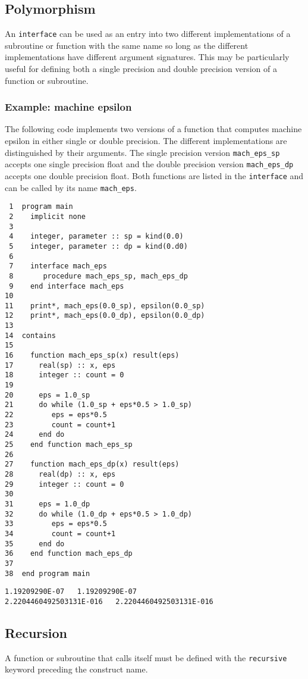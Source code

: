 \documentclass[11pt]{article}
\begin{document}
\subsection{Polymorphism}
\label{sec:orgheadline49}
An \texttt{interface} can be used as an entry into two different implementations of a subroutine or function with the same name so long as the different implementations have different argument signatures. This may be particularly useful for defining both a single precision and double precision version of a function or subroutine.
\subsubsection{Example: machine epsilon}
\label{sec:orgheadline48}
The following code implements two versions of a function that computes machine epsilon in either single or double precision. The different implementations are distinguished by their arguments. The single precision version \texttt{mach\_eps\_sp} accepts one single precision float and the double precision version \texttt{mach\_eps\_dp} accepts one double precision float. Both functions are listed in the \texttt{interface} and can be called by its name \texttt{mach\_eps}.

\begin{verbatim}
 1  program main
 2    implicit none
 3  
 4    integer, parameter :: sp = kind(0.0)
 5    integer, parameter :: dp = kind(0.d0)
 6  
 7    interface mach_eps
 8       procedure mach_eps_sp, mach_eps_dp
 9    end interface mach_eps
10  
11    print*, mach_eps(0.0_sp), epsilon(0.0_sp)
12    print*, mach_eps(0.0_dp), epsilon(0.0_dp)
13  
14  contains
15  
16    function mach_eps_sp(x) result(eps)
17      real(sp) :: x, eps
18      integer :: count = 0
19  
20      eps = 1.0_sp
21      do while (1.0_sp + eps*0.5 > 1.0_sp)
22         eps = eps*0.5
23         count = count+1
24      end do
25    end function mach_eps_sp
26  
27    function mach_eps_dp(x) result(eps)
28      real(dp) :: x, eps
29      integer :: count = 0
30  
31      eps = 1.0_dp
32      do while (1.0_dp + eps*0.5 > 1.0_dp)
33         eps = eps*0.5
34         count = count+1
35      end do
36    end function mach_eps_dp
37  
38  end program main
\end{verbatim}

\begin{verbatim}
1.19209290E-07   1.19209290E-07
2.2204460492503131E-016   2.2204460492503131E-016
\end{verbatim}

\subsection{Recursion}
\label{sec:orgheadline51}
A function or subroutine that calls itself must be defined with the \texttt{recursive} keyword preceding the construct name.
\end{document}
